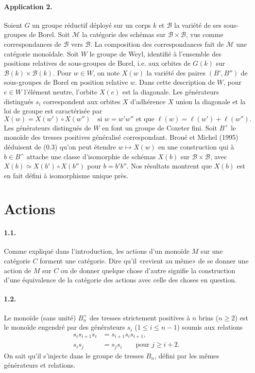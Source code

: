 \documentclass[11pt]{article}
\newcommand{\calB}{\mathcal B}
\newcommand{\calM}{\mathcal M}
\begin{document}
\paragraph{Application 2.} Soient $G$ un groupe réductif déployé sur un corps $k$ et $\calB$ la variété de ses sous-groupes de Borel. Soit $\calM$ la catégorie des schémas sur $\calB\times\calB$, vus comme correspondances de $\calB$ vers $\calB$. La composition des correspondances fait de $\calM$ une catégorie monoïdale. Soit $W$ le groupe de Weyl, identifié à l'ensemble des positions relatives de sous-groupes de Borel, i.e. aux orbites de $G(k)$ sur $\calB(k)\times\calB(k)$. Pour $w\in W$, on note $X(w)$ la variété des paires $(B',B'')$ de sous-groupes de Borel en position relative $w$. Dans cette description de $W$, pour $e\in W$ l'élément neutre, l'orbite $X(e)$ est la diagonale. Les générateurs distingués $s_i$ correspondent aux orbites $X$ d'adhérence $X$ union la diagonale et la loi de groupe est caractérisée par
\begin{equation}
 X(w)=X(w')\circ X(w'')
\quad\text{si }w=w'w''\text{ et que }\ell(w)=\ell(w')+\ell(w'').
\tag{0.3}
\end{equation}
Les générateurs distingués de $W$ en font un groupe de Coxeter fini. Soit $B^+$ le monoïde des tresses positives généralisé correspondant. Broué et Michel (1995) déduisent de (0.3) qu'on peut étendre $w\mapsto X(w)$ en une construction qui à $b\in B^+$ attache une classe d'isomorphie de schémas $X(b)$ sur $\calB\times\calB$, avec $X(b)\simeq X(b')\circ X(b'')$ pour $b=b'b''$. Nos résultats montrent que $X(b)$ est en fait défini à isomorphisme unique près.

\section{Actions}
\paragraph{1.1.} Comme expliqué dans l'introduction, les actions d'un monoïde $M$ sur une catégorie $C$ forment une catégorie. Dire qu'il «revient au même» de se donner une action de $M$ sur $C$ ou de donner quelque chose d'autre signifie la construction d'une équivalence de la catégorie des actions avec celle des choses en question.

\paragraph{1.2.} Le monoïde (sans unité) $B_n^+$ des tresses strictement positives à $n$ brins ($n\geq2$) est le monoïde engendré par des générateurs $s_i$ ($1\leq i\leq n-1$) soumis aux relations
\begin{align}
 s_i s_{i+1}s_i&=s_{i+1}s_i s_{i+1},\tag{1.2.1}\\
 s_i s_j&=s_j s_i\qquad\text{pour }j\geq i+2.
\end{align}
On sait qu'il s'injecte dans le groupe de tresses $B_n$, défini par les mêmes générateurs et relations.
\end{document}
